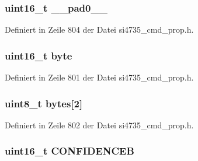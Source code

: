 \subsubsection[{\+\_\+\+\_\+pad0\+\_\+\+\_\+}]{\setlength{\rightskip}{0pt plus 5cm}uint16\+\_\+t \+\_\+\+\_\+pad0\+\_\+\+\_\+}\label{unionfm__rds__confidence_a77132c2c26a75f5b8751b235cda23828}


Definiert in Zeile 804 der Datei si4735\+\_\+cmd\+\_\+prop.\+h.

\hypertarget{unionfm__rds__confidence_ab0549c1b5ea980a02e7eab77e21fea49}{}
\subsubsection[{byte}]{\setlength{\rightskip}{0pt plus 5cm}uint16\+\_\+t byte}\label{unionfm__rds__confidence_ab0549c1b5ea980a02e7eab77e21fea49}


Definiert in Zeile 801 der Datei si4735\+\_\+cmd\+\_\+prop.\+h.

\hypertarget{unionfm__rds__confidence_a46e4c05d20a047ec169f60d3167e912e}{}
\subsubsection[{bytes}]{\setlength{\rightskip}{0pt plus 5cm}uint8\+\_\+t bytes\mbox{[}2\mbox{]}}\label{unionfm__rds__confidence_a46e4c05d20a047ec169f60d3167e912e}


Definiert in Zeile 802 der Datei si4735\+\_\+cmd\+\_\+prop.\+h.

\hypertarget{unionfm__rds__confidence_ad50cf40b7308de47174d7172846def72}{}
\subsubsection[{C\+O\+N\+F\+I\+D\+E\+N\+C\+E\+B}]{\setlength{\rightskip}{0pt plus 5cm}uint16\+\_\+t C\+O\+N\+F\+I\+D\+E\+N\+C\+E\+B}\label{unionfm__rds__confidence_ad50cf40b7308de47174d7172846def72}


